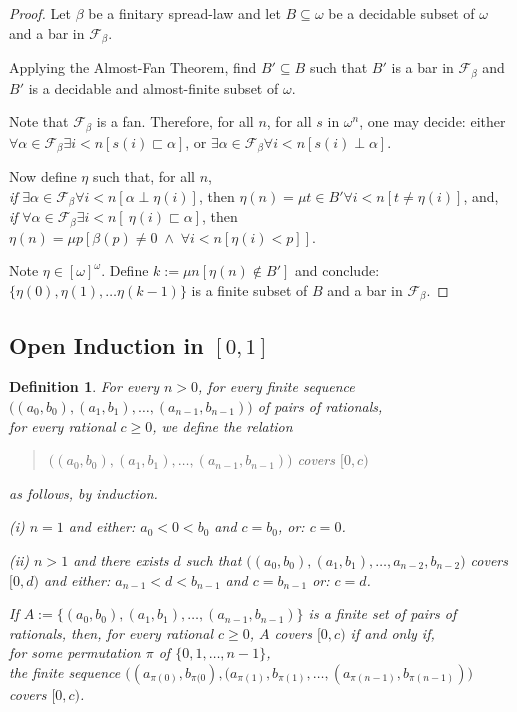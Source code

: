 \documentclass[a4paper]{amsart}
\theoremstyle{plain}
\newtheorem{definition}{Definition}
\begin{document}
 \begin{proof}  Let $\beta$ be a finitary spread-law and let $B\subseteq \omega$ be a decidable subset of $\omega$ and a bar in $\mathcal{F}_\beta$.
 
 Applying the Almost-Fan Theorem, find $B'\subseteq B$ such that $B'$ is a bar in $\mathcal{F}_\beta$ and $B'$ is a decidable and almost-finite subset of $\omega$. 
 
 Note that $\mathcal{F}_\beta$ is a fan. Therefore, for all $n$, for all $s$ in $\omega^n$, one may decide: either $\forall \alpha \in \mathcal{F}_\beta \exists i<n[s(i)\sqsubset \alpha]$, or $\exists \alpha \in \mathcal{F}_\beta\forall i <n[s(i)\perp\alpha]$. 
 
 
 
  Now define $\eta$  such that, for all $n$, \\\textit{if}  $\exists \alpha \in \mathcal{F}_\beta\forall i<n[\alpha\perp \eta(i)]$, then $\eta(n) = \mu t \in B'\forall i<n[t\neq \eta(i)]$, and, \\\textit{if } $\forall \alpha \in \mathcal{F}_\beta\exists i<n[\ \eta(i)\sqsubset\alpha]$, then $\eta(n)=\mu p[\beta(p)\neq 0 \;\wedge\;\forall i<n[\eta(i)<p]]$.  
  
  Note $\eta\in [\omega]^\omega$. Define $k:=\mu n[\eta(n)\notin B']$ and conclude: $\{\eta(0), \eta(1), \ldots\eta(k-1)\}$ is a finite subset of $B$ and a bar in $\mathcal{F}_\beta$.  \end{proof}

\subsection{Open Induction in $[0,1]$}\label{SS:openinduction}

\begin{definition} For every $n>0$, for every finite sequence \\$\bigl((a_0, b_0), (a_1, b_1), \ldots, (a_{n-1}, b_{n-1})\bigr)$ of pairs of rationals, \\for every rational $c\ge 0$, we define the relation \begin{quote} $\bigl((a_0, b_0), (a_1, b_1), \ldots, (a_{n-1}, b_{n-1})\bigr)$ \emph{covers} $[0,c)$ \end{quote} as follows, by induction.

(i) $n=1$ and \emph{either:}  $a_0<0<b_0$ and $c=b_0$, \emph{or:}  $c=0$.

(ii) $n>1$ and there exists $d$ such that $\bigl((a_0, b_0), (a_1, b_1), \ldots, a_{n-2}, b_{n-2})$ covers $[0,d)$ and \emph{either:} $a_{n-1}<d<b_{n-1}$ and $c=b_{n-1}$ \emph{or:} $c=d$.

\smallskip If $A:=\{(a_0, b_0), (a_1, b_1), \ldots, (a_{n-1}, b_{n-1})\}$ is a finite \emph{set} of pairs of rationals, then, for every rational $c\ge 0$, \emph{$A$ covers $[0,c)$} if and only if, \\for some permutation $\pi$ of  $\{0,1,\ldots, n-1\}$, \\the finite sequence $\bigl((a_{\pi(0)}, b_{\pi(0}), (a_{\pi(1)}, b_{\pi(1)}, \ldots, (a_{\pi(n-1)}, b_{\pi(n-1)})\bigr)$ covers $[0,c)$. \end{definition}
\end{document}
